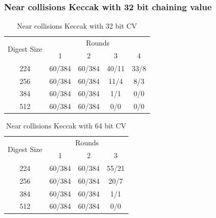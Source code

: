 \documentclass{beamer}
\begin{document}

\begin{frame}
\frametitle{Near collisions Keccak with 32 bit chaining value}
\begin{table} \footnotesize
    \begin{tabular}{ | c | c | c | c | c | } \hline
     \multirow{2}{*}{Digest Size} & \multicolumn{4}{|c|}{Rounds} \\ \cline{2-5}
                 & 1      & 2      & 3     & 4    \\ \hline
     224         & 60/384 & 60/384 & 40/11 & 33/8 \\ \hline
     256         & 60/384 & 60/384 & 11/4  & 8/3  \\ \hline
     384         & 60/384 & 60/384 & 1/1   & 0/0  \\ \hline
     512         & 60/384 & 60/384 & 0/0   & 0/0  \\ \hline
    \end{tabular}
    \caption{Near collisions Keccak with 32 bit CV}
\end{table}
\begin{table} \footnotesize
  \begin{tabular}{ | c | c | c | c | }  \hline
     \multirow{2}{*}{Digest Size} & \multicolumn{3}{|c|}{Rounds} \\ \cline{2-4}
                 & 1      & 2      & 3         \\ \hline
     224         & 60/384 & 60/384 & 55/21 \\ \hline
     256         & 60/384 & 60/384 & 20/7  \\ \hline
     384         & 60/384 & 60/384 & 1/1   \\ \hline
     512         & 60/384 & 60/384 & 0/0   \\ \hline
  \end{tabular}
  \caption{Near collisions Keccak with 64 bit CV}
\end{table}
\end{frame}
\end{document}
